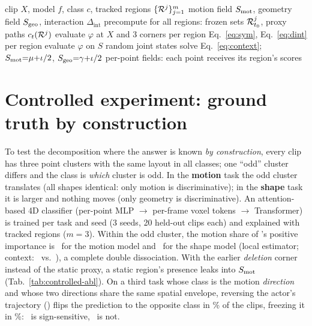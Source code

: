 \begin{algorithm}[h]
\caption{\method: Kinematic Causal Attribution}
\label{alg:kca}
\begin{algorithmic}[1]
\Require clip $X$, model $f$, class $c$, tracked regions $\{\mathcal{R}^j\}_{j=1}^{m}$
\Ensure motion field $S_{\mathrm{mot}}$, geometry field $S_{\mathrm{geo}}$, interaction $\Delta_{\mathrm{int}}$
\State precompute for all regions: frozen sets $\mathcal{R}^j_{t_0}$, proxy paths $c_t(\mathcal{R}^j)$
  \State evaluate $\varphi$ at $X$ and 3 corners per region 
  \State Eq.~\eqref{eq:sym}, Eq.~\eqref{eq:dint} per region
\Else
  \State evaluate $\varphi$ on $S$ random joint states 
  \State solve Eq.~\eqref{eq:context}; $S_{\mathrm{mot}}{=}\mu{+}\iota/2$, $S_{\mathrm{geo}}{=}\gamma{+}\iota/2$
\EndIf
\State \Return per-point fields: each point receives its region's scores
\end{algorithmic}
\end{algorithm}



\section{Controlled experiment: ground truth by construction}
\label{supp:controlled}
To test the decomposition where the answer is known \emph{by construction}, every clip has three point clusters with the same layout in all classes; one ``odd'' cluster differs and the class is \emph{which} cluster is odd. In the \textbf{motion} task the odd cluster translates (all shapes identical: only motion is discriminative); in the \textbf{shape} task it is larger and nothing moves (only geometry is discriminative). An attention-based 4D classifier (per-point MLP $\to$ per-frame voxel tokens $\to$ Transformer) is trained per task and seed (3 seeds, 20 held-out clips each) and explained with tracked regions ($m{=}3$). Within the odd cluster, the motion share of \method's positive importance is \NumCtrlMot\ for the motion model and \NumCtrlShape\ for the shape model (local estimator; context: \NumCtrlMotCtx\ vs.\ \NumCtrlShapeCtx), \ie a complete double dissociation. With the earlier \emph{deletion} corner instead of the static proxy, a static region's presence leaks into $S_{\mathrm{mot}}$ (Tab.~\ref{tab:controlled-abl}). On a third task whose class is the motion \emph{direction} and whose two directions share the same spatial envelope, reversing the actor's trajectory (\dsp) flips the prediction to the opposite class in \NumCtrlDspFlip\% of the clips, freezing it in \NumCtrlFrzFlip\%: \dsp\ is sign-sensitive, \frz\ is not.


